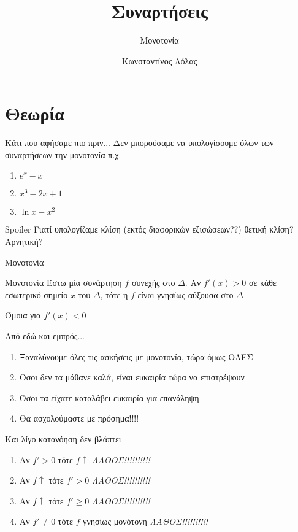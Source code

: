 \documentclass[greek]{beamer}
\title{Συναρτήσεις}
\subtitle{Μονοτονία}
\author[Λόλας]{Κωνσταντίνος Λόλας}
\date{}
\begin{document}
\begin{frame}
 \titlepage
\end{frame}

\section{Θεωρία}
\begin{frame}{Κάτι που αφήσαμε πιο πριν...}
 Δεν μπορούσαμε να υπολογίσουμε όλων των συναρτήσεων την μονοτονία π.χ.
 \begin{enumerate}
  \item $e^x-x$
  \item $x^3-2x+1$
  \item $\ln x - x^2$
 \end{enumerate}
\end{frame}

\begin{frame}{Spoiler}
 Γιατί υπολογίζαμε κλίση (εκτός διαφορικών εξισώσεων??)
  θετική κλίση? Αρνητική?
\end{frame}

\begin{frame}{Μονοτονία}
 \begin{block}{Μονοτονία}
  Έστω μία συνάρτηση $f$ συνεχής στο $Δ$. Αν $f'(x)>0$ σε κάθε εσωτερικό σημείο $x$ του $Δ$, τότε η $f$ είναι γνησίως αύξουσα στο $Δ$
 \end{block}
  Όμοια για $f'(x)<0$
\end{frame}

\begin{frame}{Από εδώ και εμπρός...}
 \begin{enumerate}
  \item<1-> Ξαναλύνουμε όλες τις ασκήσεις με μονοτονία, τώρα όμως ΟΛΕΣ
  \item<2-> Όσοι δεν τα μάθανε καλά, είναι ευκαιρία τώρα να επιστρέψουν
  \item<3-> Όσοι τα είχατε καταλάβει ευκαιρία για επανάληψη
  \item<4-> Θα ασχολούμαστε με πρόσημα!!!!
 \end{enumerate}
\end{frame}

\begin{frame}{Και λίγο κατανόηση δεν βλάπτει}
 \begin{enumerate}
   \item<1-> Αν $f'>0$ τότε $f\uparrow$  {\emph{ΛΑΘΟΣ!!!!!!!!!!}}
   \item<3-> Αν $f\uparrow$ τότε $f'>0$  {\emph{ΛΑΘΟΣ!!!!!!!!!!}}
   \item<5-> Αν $f\uparrow$ τότε $f'\ge 0$  {\emph{ΛΑΘΟΣ!!!!!!!!!!}}
   \item<7-> Αν $f'\ne 0$ τότε $f$ γνησίως μονότονη  {\emph{ΛΑΘΟΣ!!!!!!!!!!}}
 \end{enumerate}
\end{frame}
\end{document}
